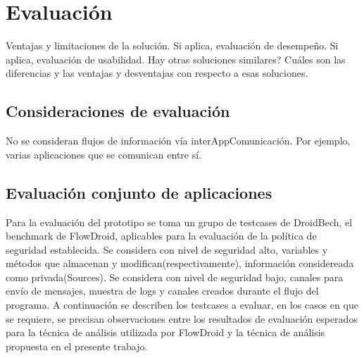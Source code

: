 \label{ch:evaluacion}
\chapter{Evaluación}
Ventajas y limitaciones de la solución.\newline 
Si aplica, evaluación de desempeño.  \newline 
Si aplica, evaluación de usabilidad.  
Hay otras soluciones similares? \newline 
Cuáles son las diferencias y las ventajas y desventajas con respecto a esas soluciones.

\section{Consideraciones de evaluación}
No se consideran flujos de información vía interAppComunicación. Por ejemplo,
varias aplicaciones que se comunican entre sí.

\section{Evaluación conjunto de aplicaciones}
Para la evaluación del prototipo se toma un grupo de testcases de DroidBech, el
benchmark de FlowDroid, aplicables para la evaluación de la política de
seguridad establecida.\newline 
Se considera con nivel de seguridad alto, variables y métodos que almacenan y
modifican(respectivamente), información considereada como privada(Sources).\newline 
Se considera con nivel de seguridad bajo, canales para envío de mensajes,
muestra de logs y canales creados durante el flujo del programa.\newline
A continuación se describen los testcases a evaluar, en los casos en que se
requiere, se precisan observaciones entre los resultados de evaluación esperados
para la técnica de análisis utilizada por FlowDroid y la técnica de análisis
propuesta en el presente trabajo.\newline

